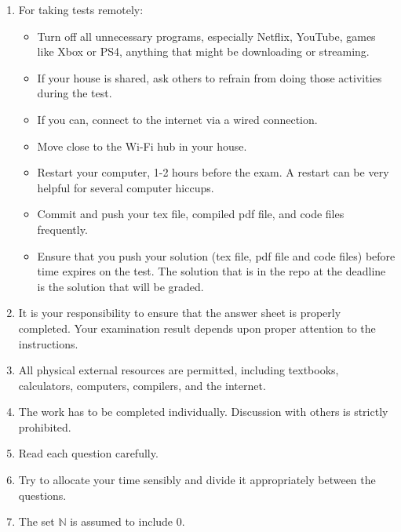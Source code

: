 \documentclass[12pt,fleqn]{examtst}
\begin{document}
\begin{enumerate}

\item For taking tests remotely: 
\begin{itemize}
\item Turn off all unnecessary programs, especially Netflix, YouTube, games like
  Xbox or PS4, anything that might be downloading or streaming.
\item If your house is shared, ask others to refrain from doing those activities
  during the test.
\item If you can, connect to the internet via a wired connection.
\item Move close to the Wi-Fi hub in your house. 
\item Restart your computer, 1-2 hours before the exam. A restart can be very
  helpful for several computer hiccups.
\item Commit and push your tex file, compiled pdf file, and code files
  frequently.
\item Ensure that you push your solution (tex file, pdf file and code files)
  before time expires on the test.  The solution that is in the repo at the
  deadline is the solution that will be graded.
\end{itemize}
\item It is your responsibility to ensure that the answer sheet is properly
  completed. Your examination result depends upon proper attention to the
  instructions.
\item All physical external resources are permitted, including textbooks, calculators,
  computers, compilers, and the internet.
\item The work has to be completed individually.  Discussion with others is
  strictly prohibited.
\item Read each question carefully.
\item Try to allocate your time sensibly and divide it appropriately between the
  questions.
\item The set $\mathbb{N}$ is assumed to include $0$.
\end{enumerate}


\renewcommand{\labelenumi}{\Alph{enumi}.}

\newpage

\end{document}
